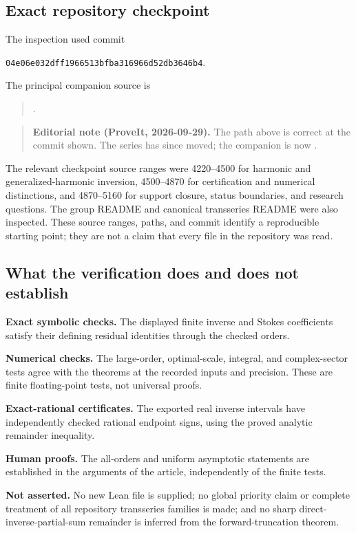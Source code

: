 \documentclass[11pt,a4paper]{article}
\theoremstyle{definition}
\numberwithin{equation}{section}
\newcommand{\statusline}[2]{\noindent\textbf{#1.} #2\par}
\begin{document}
\subsection{Exact repository checkpoint}
The inspection used commit
\begin{center}\small\texttt{04e06e032dff1966513bfba316966d52db3646b4}.\end{center}
The principal companion source is
\begin{quote}\small
{}.
\end{quote}
\begin{quote}\small\textbf{Editorial note (ProveIt, 2026-09-29).} The path above is correct at the commit shown. The series has since moved; the companion is now .\end{quote}
The relevant checkpoint source ranges were 4220--4500 for harmonic and generalized-harmonic inversion, 4500--4870 for certification and numerical distinctions, and 4870--5160 for support closure, status boundaries, and research questions. The group README and canonical transseries README were also inspected. These source ranges, paths, and commit identify a reproducible starting point; they are not a claim that every file in the repository was read.

\subsection{What the verification does and does not establish}
\statusline{Exact symbolic checks}{The displayed finite inverse and Stokes coefficients satisfy their defining residual identities through the checked orders.}
\statusline{Numerical checks}{The large-order, optimal-scale, integral, and complex-sector tests agree with the theorems at the recorded inputs and precision. These are finite floating-point tests, not universal proofs.}
\statusline{Exact-rational certificates}{The exported real inverse intervals have independently checked rational endpoint signs, using the proved analytic remainder inequality.}
\statusline{Human proofs}{The all-orders and uniform asymptotic statements are established in the arguments of the article, independently of the finite tests.}
\statusline{Not asserted}{No new Lean file is supplied; no global priority claim or complete treatment of all repository transseries families is made; and no sharp direct-inverse-partial-sum remainder is inferred from the forward-truncation theorem.}
\end{document}
